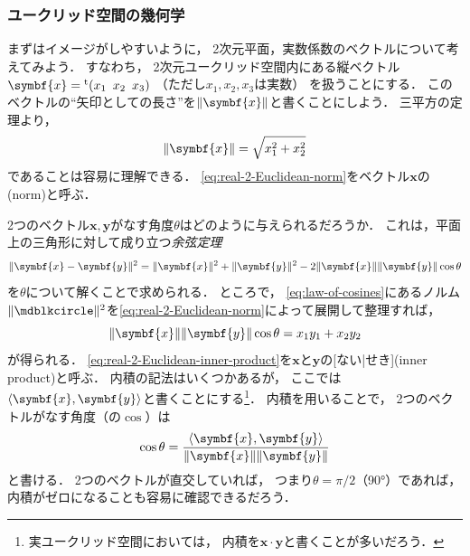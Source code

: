 \documentclass[
]{sotsu}
\begin{document}
\subsubsection{ユークリッド空間の幾何学}
\label{sec:Euclidean-inner-product-space}

\quad 
まずはイメージがしやすいように，
2次元平面，実数係数のベクトルについて考えてみよう．
すなわち，
2次元ユークリッド空間内にある縦ベクトル$\symbf{x} = \cvector{x_1 ; x_2 ; x_3}$
（ただし$x_1, x_2, x_3$は実数）
を扱うことにする．
このベクトルの``矢印としての長さ''を$\norm{\symbf{x}}$と書くことにしよう．
三平方の定理より，
\begin{equation}
    \label{eq:real-2-Euclidean-norm}
    \norm{\symbf{x}} = \sqrt{ x_1^2 + x_2^2 }
\end{equation}
であることは容易に理解できる．
\cref{eq:real-2-Euclidean-norm}をベクトル$\symbf{x}$の(norm)と呼ぶ．

2つのベクトル$\symbf{x}, \symbf{y}$がなす角度$\theta$はどのように与えられるだろうか．
これは，平面上の三角形に対して成り立つ\emph{余弦定理}
\begin{equation}
    \label{eq:law-of-cosines}
    \norm{\symbf{x} - \symbf{y}}^2 
        = \norm{\symbf{x}}^2 + \norm{\symbf{y}}^2 - 2 \norm{\symbf{x}} \norm{\symbf{y}} \cos \theta
\end{equation}
を$\theta$について解くことで求められる．
ところで，
\cref{eq:law-of-cosines}にあるノルム$\norm{\bigdot}^2$を\cref{eq:real-2-Euclidean-norm}によって展開して整理すれば，
\begin{equation}
    \label{eq:real-2-Euclidean-inner-product}
    \norm{\symbf{x}} \norm{\symbf{y}} \cos \theta = x_1 y_1 + x_2 y_2
\end{equation}
が得られる．
\cref{eq:real-2-Euclidean-inner-product}を$\symbf{x}$と$\symbf{y}$の[ない|せき](inner product)と呼ぶ．
内積の記法はいくつかあるが，
ここでは$\iparen{\symbf{x}, \symbf{y}}$と書くことにする\footnote{
    実ユークリッド空間においては，
    内積を$\symbf{x} \cdotp \symbf{y}$と書くことが多いだろう．
}．
内積を用いることで，
2つのベクトルがなす角度（の$\cos$）は
\begin{equation}
    \label{eq:real-2-Euclidean-vector-angle}
    \cos \theta = \frac{\iparen{\symbf{x}, \symbf{y}}}{\norm{\symbf{x}} \norm{\symbf{y}}}
\end{equation}
と書ける．
2つのベクトルが直交していれば，
つまり$\theta = \pi / 2$（90°）であれば，
内積がゼロになることも容易に確認できるだろう．
\end{document}
